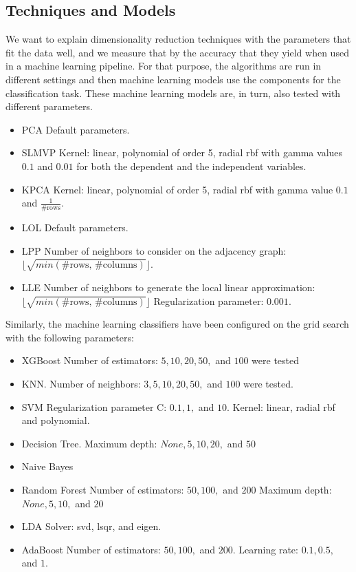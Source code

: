 \subsection{Techniques and Models}
We want to explain dimensionality reduction techniques with the parameters that fit the data well, and we measure that by the accuracy that they yield when used in a machine learning pipeline. For that purpose, the algorithms are run in different settings and then machine learning models use the components for the classification task. These machine learning models are, in turn, also tested with different parameters.

\begin{itemize}
    \item PCA
          \subitem Default parameters.
    \item SLMVP
          \subitem Kernel: linear, polynomial of order 5, radial rbf with gamma values $0.1$ and $0.01$ for both the dependent and the independent variables.
    \item KPCA
          \subitem Kernel: linear, polynomial of order 5, radial rbf with gamma value $0.1$ and $\frac{1}{\text{\# rows}}$.
    \item LOL
          \subitem Default parameters.
    \item LPP
          \subitem  Number of neighbors to consider on the adjacency graph:
          \subitem $\lfloor\sqrt{min(\text{\# rows, \# columns})}\rfloor$.
    \item LLE
          \subitem Number of neighbors to generate the local linear approximation:
          \subitem $\lfloor\sqrt{min(\text{\# rows, \# columns})}\rfloor$
          \subitem Regularization parameter: $0.001$.
\end{itemize}

Similarly, the machine learning classifiers have been configured on the grid search with the following parameters:

\begin{itemize}
    \item XGBoost
          \subitem Number of estimators: $5, 10, 20, 50,$ and $100$ were tested
    \item KNN.
          \subitem Number of neighbors: $3, 5, 10, 20, 50,$ and $100$ were tested.
    \item SVM
          \subitem Regularization parameter C: $0.1, 1,$ and $10$.
          \subitem Kernel: linear, radial rbf and polynomial.
    \item Decision Tree.
          \subitem Maximum depth: $None, 5, 10, 20,$ and $50$
    \item Naive Bayes
    \item Random Forest
          \subitem Number of estimators: $50, 100,$ and $200$
          \subitem Maximum depth: $None, 5, 10,$ and $20$
    \item LDA
          \subitem Solver: svd, lsqr, and eigen.
    \item AdaBoost
          \subitem Number of estimators: $50, 100,$ and $200$.
          \subitem Learning rate: $0.1, 0.5,$ and $1$.
\end{itemize}

